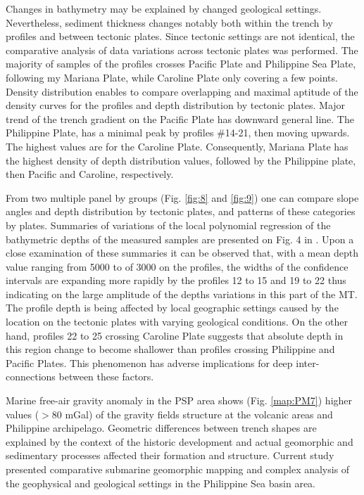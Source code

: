 \documentclass[11pt,a4paper]{report}
\begin{document}
{Changes in bathymetry may be explained by changed geological settings. Nevertheless, sediment thickness changes notably both within the trench by profiles and between tectonic plates. Since tectonic settings are not identical, the comparative analysis of data variations across tectonic plates was performed. The majority of samples of the profiles crosses Pacific Plate and Philippine Sea Plate, following my Mariana Plate, while Caroline Plate only covering a few points. Density distribution enables to compare overlapping and maximal aptitude of the density curves for the profiles and depth distribution by tectonic plates. Major trend of the trench gradient on the Pacific Plate has downward general line. The Philippine Plate, has a minimal peak by profiles \#14-21, then moving upwards. The highest values are for the Caroline Plate. Consequently, Mariana Plate has the highest density of depth distribution values, followed by the Philippine plate, then Pacific and Caroline, respectively.

From two multiple panel by groups (Fig. \ref{fig:8} and \ref{fig:9}) one can compare slope angles and depth distribution by tectonic plates, and patterns of these categories by plates. Summaries of variations of the local polynomial regression of the bathymetric depths of the measured samples are presented on Fig. 4 in \cite{Lemenkova2019105}. Upon a close examination of these summaries it can be observed that, with a mean depth value ranging from 5000 to of 3000 on the profiles, the widths of the confidence intervals are expanding more rapidly by the profiles 12 to 15 and 19 to 22 thus indicating on the large amplitude of the depths variations in this part of the \ac{MT}. The profile depth is being affected by local geographic settings caused by the location on the tectonic plates with varying geological conditions. On the other hand, profiles 22 to 25 crossing Caroline Plate \cite{Lemenkova2019105} suggests that absolute depth in this region change to become shallower than profiles crossing Philippine and Pacific Plates. This phenomenon has adverse implications for deep inter-connections between these factors.

Marine free-air gravity anomaly in the \ac{PSP} area shows (Fig. \ref{map:PM7}) higher values ($>80$ mGal) of the gravity fields structure at the volcanic areas and Philippine archipelago. Geometric differences between trench shapes are explained by the context of the historic development and actual geomorphic and sedimentary processes affected their formation and structure. Current study presented comparative submarine geomorphic mapping and complex analysis of the geophysical and geological settings in the Philippine Sea basin area. 

}
\end{document}
